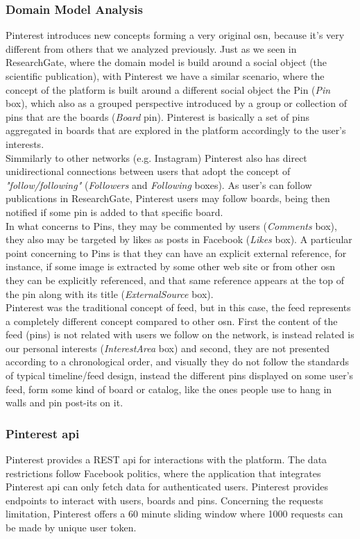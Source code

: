 \subsubsection*{Domain Model Analysis}
Pinterest introduces new concepts forming a very original \gls{osn}, because it's very different from others that we analyzed previously. Just as we seen in ResearchGate, where the domain model is build around a social object (the scientific publication), with Pinterest we have a similar scenario, where the concept of the platform is built around a different social object the Pin (\textit{Pin} box), which also as a grouped perspective introduced by a group or collection of pins that are the boards (\textit{Board} pin). Pinterest is basically a set of pins aggregated in boards that are explored in the platform accordingly to the user's interests.\\
\indent Simmilarly to other networks (e.g. Instagram) Pinterest also has direct unidirectional connections between users that adopt the concept of \textit{"follow/following"} (\textit{Followers} and \textit{Following} boxes). As user's can follow publications in ResearchGate, Pinterest users may follow boards, being then notified if some pin is added to that specific board.\\
\indent In what concerns to Pins, they may be commented by users (\textit{Comments} box), they also may be targeted by likes as posts in Facebook (\textit{Likes} box). A particular point concerning to Pins is that they can have an explicit external reference, for instance, if some image is extracted by some other web site or from other \gls{osn} they can be explicitly referenced, and that same reference appears at the top of the pin along with its title (\textit{ExternalSource} box).\\
\indent Pinterest was the traditional concept of feed, but in this case, the feed represents a completely different concept compared to other \gls{osn}. First the content of the feed (pins) is not related with users we follow on the network, is instead related is our personal interests (\textit{InterestArea} box) and second, they are not presented according to a chronological order, and visually they do not follow the standards of typical timeline/feed design, instead the different pins displayed on some user's feed, form some kind of board or catalog, like the ones people use to hang in walls and pin post-its on it.

\subsubsection*{Pinterest \gls{api}}
Pinterest provides a REST \gls{api} \citep{pintdev} for interactions with the platform. The data restrictions follow Facebook politics, where the application that integrates Pinterest \gls{api} can only fetch data for authenticated users. Pinterest provides endpoints to interact with users, boards and pins. Concerning the requests limitation, Pinterest offers a 60 minute sliding window where 1000 requests can be made by unique user token.

